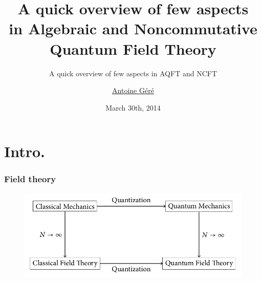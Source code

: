 \documentclass[9pt]{beamer}
\title{A quick overview of few aspects \\[1pt] in Algebraic and Noncommutative Quantum Field Theory}
\subtitle{A quick overview of few aspects in AQFT and NCFT}
\author{\href{mailto:gere@dima.unige.it}{Antoine Géré}}
\date{March 30th, 2014}
\institute{\href{http://www.unige.it/strutture/ou/staff/DIMA}{Università degli studi di Genova, Dipartimento di Matematica}}
\begin{document}



{%
\begin{frame}[plain]
\titlepage
\end{frame}
}%

\section{Intro.} 

\begin{frame}

\frametitle{Field theory}

\vfill

\begin{figure}[h!]
 \centering
 \includegraphics[scale=0.4]{./fig_qft.JPG}
\end{figure}

\vfill

\end{frame}
\end{document}
